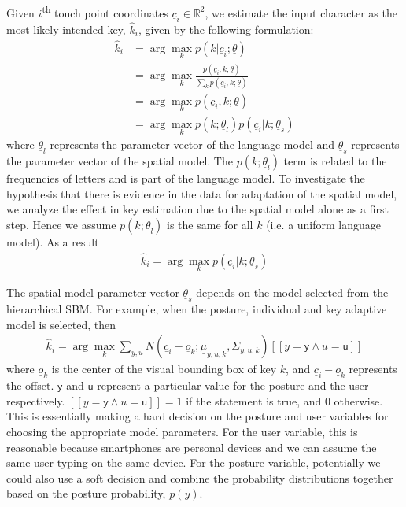 \documentclass{sigchi}
\begin{document}
Given $i$\textsuperscript{th} touch point coordinates $\underline c_i \in \mathbb{R}^2$, we estimate the input character as the most likely intended key, $\hat k_i$,  given by the following formulation:
\begin{align}
\hat k_i &= \arg\max_k p(k | \underline c_i; \underline \theta) \\
          &= \arg\max_k \frac{p(\underline c_i, k; \underline \theta)}{\sum_k p(\underline c_i, k; \underline \theta)} \\
          &= \arg\max_k p(\underline c_i, k; \underline \theta) \\
          &= \arg\max_k p(k;\underline\theta_l)p(\underline c_i | k; \underline \theta_s) \label{eq:likely-k}
\end{align}
where $\underline\theta_l$ represents the parameter vector of the language model and $\underline\theta_s$ represents the parameter vector of the spatial model. The $p(k;\underline\theta_l)$ term is related to the frequencies of letters and is part of the language model. To investigate the hypothesis that there is evidence in the data for adaptation of the spatial model, we analyze the effect in key estimation due to the spatial model alone as a first step. Hence we assume $p(k; \underline\theta_l)$ is the same for all $k$ (i.e. a uniform language model). As a result
\begin{align}
\hat k_i = \arg\max_k p(\underline c_i | k; \underline \theta_s)
\end{align}

The spatial model parameter vector $\underline \theta_s$ depends on the model selected from the hierarchical SBM. For example, when the posture, individual and key adaptive model is selected, then
\begin{align}          
\hat k_i = \arg\max_k \sum_{y, u} N(\underline c_i - \underline o_k; \underline\mu_{y,u,k}, \Sigma_{y,u,k})[[y = \textsf{y} \wedge u = \textsf{u}]]
\end{align}
where $\underline o_k$ is the center of the visual bounding box of key $k$, and $\underline c_i - \underline o_k$ 
represents the offset. $\textsf{y}$ and $\textsf{u}$ represent a particular value for the posture 
and the user respectively. $[[y = \textsf{y} \wedge u = \textsf{u}]] = 1$ if the 
statement is true, and $0$ otherwise. This is essentially making a hard decision on the 
posture and user variables for choosing the appropriate model parameters. For the user variable, 
this is reasonable because smartphones are personal devices and we can assume the 
same user typing on the same device. For the posture variable, potentially we could also 
use a soft decision and combine the probability distributions together based on the posture probability, $p(y)$. 
\end{document}

